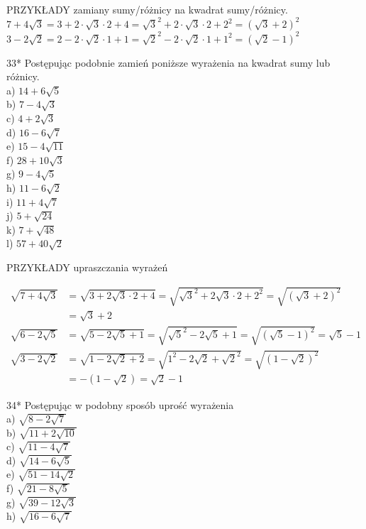 \documentclass[10pt]{article}
\begin{document}
PRZYKŁADY zamiany sumy/różnicy na kwadrat sumy/różnicy.\\
\(7+4 \sqrt{3}=3+2 \cdot \sqrt{3} \cdot 2+4=\sqrt{3}^{2}+2 \cdot \sqrt{3} \cdot 2+2^{2}=(\sqrt{3}+2)^{2}\) \(3-2 \sqrt{2}=2-2 \cdot \sqrt{2} \cdot 1+1=\sqrt{2}^{2}-2 \cdot \sqrt{2} \cdot 1+1^{2}=(\sqrt{2}-1)^{2}\)

33* Postępując podobnie zamień poniższe wyrażenia na kwadrat sumy lub różnicy.\\
a) \(14+6 \sqrt{5}\)\\
b) \(7-4 \sqrt{3}\)\\
c) \(4+2 \sqrt{3}\)\\
d) \(16-6 \sqrt{7}\)\\
e) \(15-4 \sqrt{11}\)\\
f) \(28+10 \sqrt{3}\)\\
g) \(9-4 \sqrt{5}\)\\
h) \(11-6 \sqrt{2}\)\\
i) \(11+4 \sqrt{7}\)\\
j) \(5+\sqrt{24}\)\\
k) \(7+\sqrt{48}\)\\
l) \(57+40 \sqrt{2}\)

PRZYKŁADY upraszczania wyrażeń

\[
\begin{aligned}
\sqrt{7+4 \sqrt{3}} & =\sqrt{3+2 \sqrt{3} \cdot 2+4}=\sqrt{\sqrt{3}^{2}+2 \sqrt{3} \cdot 2+2^{2}}=\sqrt{(\sqrt{3}+2)^{2}} \\
& =\sqrt{3}+2 \\
\sqrt{6-2 \sqrt{5}} & =\sqrt{5-2 \sqrt{5}+1}=\sqrt{\sqrt{5}^{2}-2 \sqrt{5}+1}=\sqrt{(\sqrt{5}-1)^{2}}=\sqrt{5}-1 \\
\sqrt{3-2 \sqrt{2}} & =\sqrt{1-2 \sqrt{2}+2}=\sqrt{1^{2}-2 \sqrt{2}+\sqrt{2}^{2}}=\sqrt{(1-\sqrt{2})^{2}} \\
& =-(1-\sqrt{2})=\sqrt{2}-1
\end{aligned}
\]

34* Postępując w podobny sposób uprość wyrażenia\\
a) \(\sqrt{8-2 \sqrt{7}}\)\\
b) \(\sqrt{11+2 \sqrt{10}}\)\\
c) \(\sqrt{11-4 \sqrt{7}}\)\\
d) \(\sqrt{14-6 \sqrt{5}}\)\\
e) \(\sqrt{51-14 \sqrt{2}}\)\\
f) \(\sqrt{21-8 \sqrt{5}}\)\\
g) \(\sqrt{39-12 \sqrt{3}}\)\\
h) \(\sqrt{16-6 \sqrt{7}}\)
\end{document}
